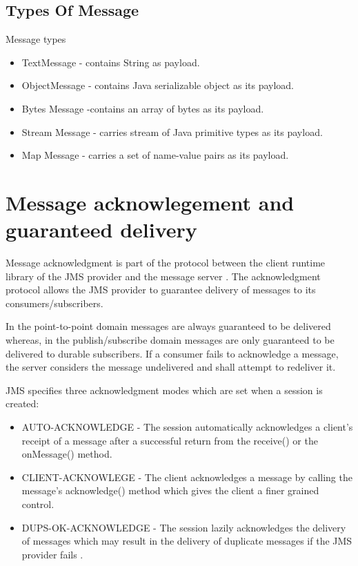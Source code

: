 \documentclass[9pt,twocolumn,twoside]{../../styles/osajnl}
\begin{document}
\subsection{Types Of Message}

Message types
\begin{itemize}
\item TextMessage - contains String as payload.
\item ObjectMessage - contains Java serializable object as its payload.
\item Bytes Message -contains an array of bytes as its payload.
\item Stream Message - carries stream of Java primitive types as its payload.
\item Map Message - carries a set of name-value pairs as its payload.
\end{itemize}

\section{Message acknowlegement and guaranteed delivery}


Message acknowledgment is part of the protocol between the client
runtime library of the JMS provider and the message server
\cite{www-jms-fischli-article}. The acknowledgment protocol allows the
JMS provider to guarantee delivery of messages to its
consumers/subscribers.

In the point-to-point domain messages are always guaranteed to be
delivered whereas, in the publish/subscribe domain messages are only
guaranteed to be delivered to durable subscribers.  If a consumer
fails to acknowledge a message, the server considers the message
undelivered and shall attempt to redeliver it.

JMS specifies three acknowledgment modes which are set when a session
is created:
\begin{itemize}
\item AUTO-ACKNOWLEDGE - The session automatically acknowledges
a client's receipt of a message after a successful return from the
receive() or the onMessage() method.
\item CLIENT-ACKNOWLEGE - The client
acknowledges a message by calling the message's acknowledge() method
which gives the client a finer grained control.
\item DUPS-OK-ACKNOWLEDGE - The session lazily acknowledges the
delivery of messages which may result in the delivery of duplicate
messages if the JMS provider fails \cite{www-jms-fischli-article}.

\end{itemize}
\end{document}
